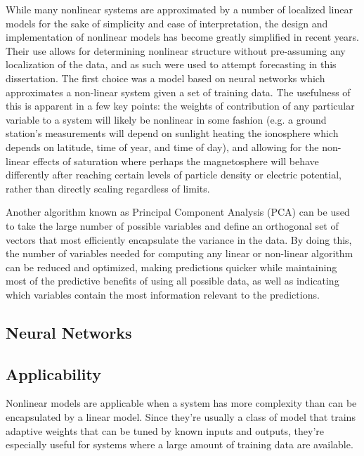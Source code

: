 While many nonlinear systems are approximated by a number of localized linear models for the sake of simplicity and ease of interpretation, the design and implementation of nonlinear models has become greatly simplified in recent years. Their use allows for determining nonlinear structure without pre-assuming any localization of the data, and as such were used to attempt forecasting in this dissertation. The first choice was a model based on neural networks \citep{NNARMA,ANNforecast} which approximates a non-linear system given a set of training data. The usefulness of this is apparent in a few key points: the weights of contribution of any particular variable to a system will likely be nonlinear in some fashion (e.g. a ground station's measurements will depend on sunlight heating the ionosphere which depends on latitude, time of year, and time of day), and allowing for the non-linear effects of saturation where perhaps the magnetosphere will behave differently after reaching certain levels of particle density or electric potential, rather than directly scaling regardless of limits.

Another algorithm known as Principal Component Analysis (PCA) can be used to take the large number of possible variables and define an orthogonal set of vectors that most efficiently encapsulate the variance in the data. By doing this, the number of variables needed for computing any linear or non-linear algorithm can be reduced and optimized, making predictions quicker while maintaining most of the predictive benefits of using all possible data, as well as indicating which variables contain the most information relevant to the predictions.


\subsection{Neural Networks}

\subsection{Applicability}
Nonlinear models are applicable when a system has more complexity than can be encapsulated by a linear model. Since they're usually a class of model that trains adaptive weights that can be tuned by known inputs and outputs, they're especially useful for systems where a large amount of training data are available.


